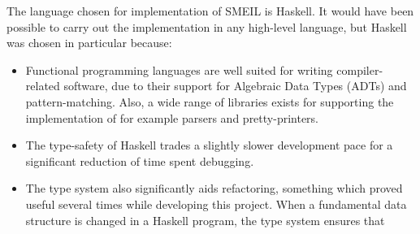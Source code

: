 




The language chosen for implementation of SMEIL is Haskell. It would have been
possible to carry out the implementation in any high-level language, but Haskell
was chosen in particular because:
\begin{itemize}
\item Functional programming languages are well suited for writing
  compiler-related software, due to their support for Algebraic Data Types
  (ADTs) and pattern-matching. Also, a wide range of libraries exists for
  supporting the implementation of for example parsers and pretty-printers.
\item The type-safety of Haskell trades a slightly slower development pace for a
  significant reduction of time spent debugging.
\item The type system also significantly aids refactoring, something which
  proved useful several times while developing this project. When a fundamental
  data structure is changed in a Haskell program, the type system ensures that 
\end{itemize}


